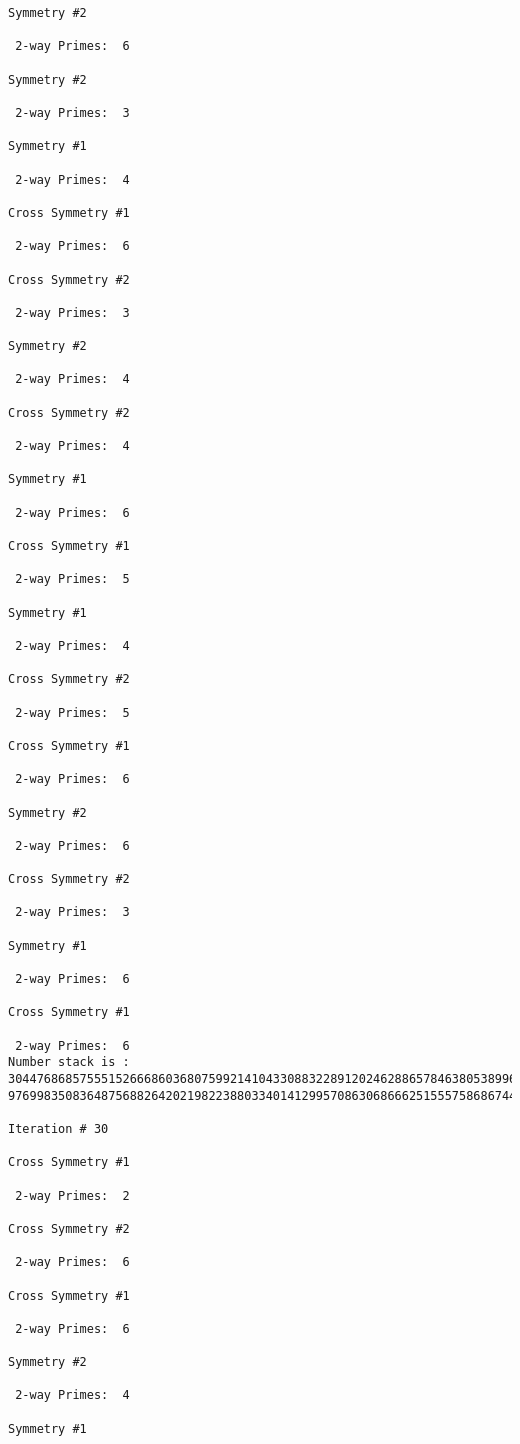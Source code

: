 \begin{verbatim}
Symmetry #2

 2-way Primes: 	6

Symmetry #2

 2-way Primes: 	3

Symmetry #1

 2-way Primes: 	4

Cross Symmetry #1

 2-way Primes: 	6

Cross Symmetry #2

 2-way Primes: 	3

Symmetry #2

 2-way Primes: 	4

Cross Symmetry #2

 2-way Primes: 	4

Symmetry #1

 2-way Primes: 	6

Cross Symmetry #1

 2-way Primes: 	5

Symmetry #1

 2-way Primes: 	4

Cross Symmetry #2

 2-way Primes: 	5

Cross Symmetry #1

 2-way Primes: 	6

Symmetry #2

 2-way Primes: 	6

Cross Symmetry #2

 2-way Primes: 	3

Symmetry #1

 2-way Primes: 	6

Cross Symmetry #1

 2-way Primes: 	6
Number stack is :
30447686857555152666860368075992141043308832289120246288657846380538996794608835958544046240163340857
97699835083648756882642021982238803340141299570863068666251555758686744037580433610426404458595388064

Iteration #	30

Cross Symmetry #1

 2-way Primes: 	2

Cross Symmetry #2

 2-way Primes: 	6

Cross Symmetry #1

 2-way Primes: 	6

Symmetry #2

 2-way Primes: 	4

Symmetry #1


\end{verbatim}
